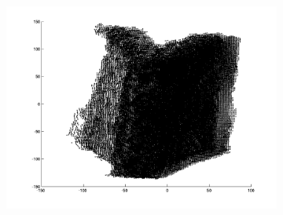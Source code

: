 \begin{figure}[H]
\begin{subfigure}[b]{0.3\textwidth}
		\includegraphics[width=\textwidth]{Images/Book6.png}
		\caption{}
	\end{subfigure}
	

\end{figure}
